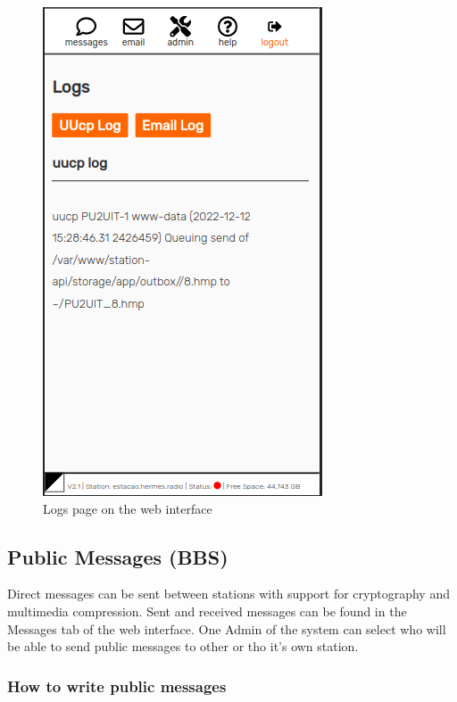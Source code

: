 \documentclass[11pt,a4paper]{article}
\begin{document}
    \begin{figure}[H]
    \centering
    \includegraphics[width=0.5\columnwidth]{screenshots/frontend/en/logs.png}
    \caption{Logs page on the web interface}
    \label{fig:logs}
\end{figure}



\subsection{Public Messages  (BBS)}

Direct messages can be sent between stations with support for cryptography and multimedia compression. Sent and received messages can be found in the Messages tab of the web interface. One Admin of the system can select who will be able to send public messages to other or tho it's own station.

\subsubsection{How to write public messages}
\end{document}
